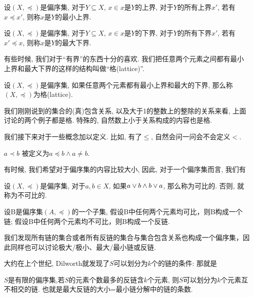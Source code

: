 \begin{definition}
	设$(X,\preceq)$是偏序集, 对于$Y \subseteq X$, $x\in x$是$Y$的上界, 对于$Y$的所有上界$x'$, 若有$x\preceq x'$, 则称$x$是$Y$的最小上界.  
\end{definition}

\begin{definition}
	设$(X,\preceq)$是偏序集, 对于$Y \subseteq X$, $x\in x$是$Y$的下界, 对于$Y$的所有下界$x'$, 若有$x'\preceq x$, 则称$x$是$Y$的最大下界.  
\end{definition}

有些时候, 我们对于``有界''的东西十分的喜欢. 我们把任意两个元素之间都有最小上界和最大下界的这样的结构叫做``格(lattice)''.

\begin{definition}[格(lattice)]
	设$(X, \preceq)$是偏序集, 如果任意两个元素都有最小上界和最大的下界, 那么称$(X, \preceq)$为格(lattice). 
\end{definition}

我们刚刚说到的集合的(真)包含关系, 以及大于1的整数上的整除的关系来看, 上面讨论的两个例子都是格. 特殊的, 自然数上小于关系构成的内容也是格. 


我们接下来对于一些概念加以定义. 比如, 有了$\leq$, 自然会问一问会不会定义$<$. 

\begin{definition}
$a \prec b$ 被定义为$a\preceq b \land a \neq b$.
\end{definition}


有时候, 我们希望对于偏序集的内容比较大小, 因此, 对于一个偏序集而言, 我们有

\begin{definition}
	设$(X,\preceq)$是偏序集, 对于$a,b\in X$, 如果$a\lor b \land b\lor a$, 那么称为可比的. 否则, 就称为不可比的. 
\end{definition}

\begin{definition}[链]
	设B是偏序集$(A,\preceq)$的一个子集, 假设B中任何两个元素均可比，则B构成一个链; 假设B中任何两个元素均不可比，则B构成一个反链. 
\end{definition}

我们发现所有链的集合或者所有反链的集合与集合包含关系也构成一个偏序集，因此同样也可以讨论极大/极小、最大/最小链或反链. 

大约在上个世纪, Dilworth就发现了$S$可以划分为$k$个的链的条件: 那就是

\begin{theorem}
$S$是有限的偏序集,若$S$的元素个数最多的反链含$k$个元素, 则$S$可以划分为$k$个元素互不相交的链. 也就是{\red 最大}{\blue 反链}的大小={\red 最小}{\blue 链分解}中的链的条数. 
\end{theorem} 

